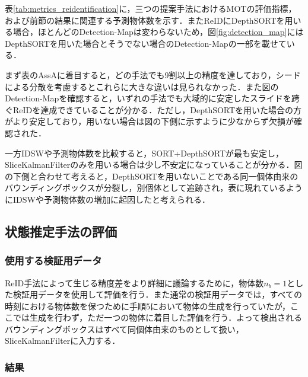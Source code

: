         表\ref{tab:metrics_reidentification}に，三つの提案手法におけるMOTの評価指標，および前節の結果に関連する予測物体数を示す．またReIDにDepthSORTを用いる場合，ほとんどのDetection-Mapは変わらないため，図\ref{fig:detection_map}にはDepthSORTを用いた場合とそうでない場合のDetection-Mapの一部を載せている．

        まず表のAssAに着目すると，どの手法でも$9$割以上の精度を達しており，シードによる分散を考慮するとこれらに大きな違いは見られなかった．また図のDetection-Mapを確認すると，いずれの手法でも大域的に安定したスライドを跨ぐReIDを達成できていることが分かる．ただし，DepthSORTを用いた場合の方がより安定しており，用いない場合は図の下側に示すように少なからず欠損が確認された．

        一方IDSWや予測物体数を比較すると，SORT+DepthSORTが最も安定し，SliceKalmanFilterのみを用いる場合は少し不安定になっていることが分かる．図の下側と合わせて考えると，DepthSORTを用いないことである同一個体由来のバウンディングボックスが分裂し，別個体として追跡され，表に現れているようにIDSWや予測物体数の増加に起因したと考えられる．

    \subsection{状態推定手法の評価}
    \label{subsec:estimation_evaluation}


        \subsubsection{使用する検証用データ}

        ReID手法によって生じる精度差をより詳細に議論するために，物体数$n_b = 1$とした検証用データを使用して評価を行う．また通常の検証用データでは，すべての時刻における物体数を保つために手順5において物体の生成を行っていたが，ここでは生成を行わず，ただ一つの物体に着目した評価を行う．よって検出されるバウンディングボックスはすべて同個体由来のものとして扱い，SliceKalmanFilterに入力する．

        \subsubsection{結果}

